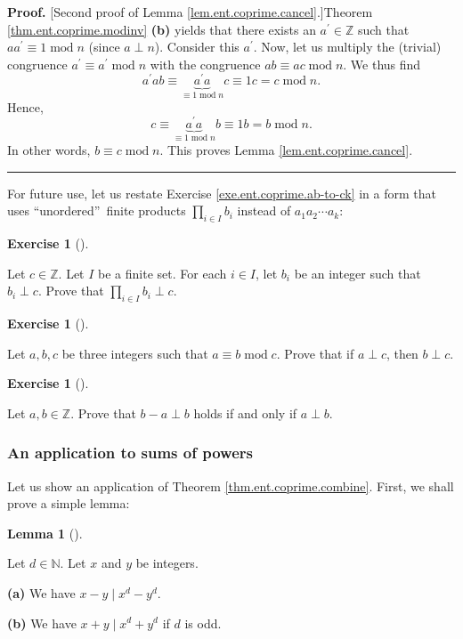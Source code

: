 \documentclass[numbers=enddot,12pt,final,onecolumn,notitlepage]{scrartcl}%
\newcounter{exer}
\numberwithin{exer}{subsection}
\theoremstyle{definition}
\newtheorem{lem}[theo]{Lemma}
\newenvironment{lemma}[1][]
{\begin{lem}[#1]\begin{leftbar}}
{\end{leftbar}\end{lem}}
\newtheorem{exmp}[exer]{Exercise}
\newenvironment{exercise}[1][]
{\begin{exmp}[#1]\begin{leftbar}}
{\end{leftbar}\end{exmp}}
\newenvironment{proof}[1][Proof]{\noindent\textbf{#1.} }{\ \rule{0.5em}{0.5em}}
\let\prodnonlimits\prod
\renewcommand{\prod}{\prodnonlimits\limits}
\begin{document}
\begin{proof}
[Second proof of Lemma \ref{lem.ent.coprime.cancel}.]Theorem
\ref{thm.ent.coprime.modinv} \textbf{(b)} yields that there exists an
$a^{\prime}\in\mathbb{Z}$ such that $aa^{\prime}\equiv1\operatorname{mod}n$
(since $a\perp n$). Consider this $a^{\prime}$. Now, let us multiply the
(trivial) congruence $a^{\prime}\equiv a^{\prime}\operatorname{mod}n$ with the
congruence $ab\equiv ac\operatorname{mod}n$. We thus find%
\[
a^{\prime}ab\equiv\underbrace{a^{\prime}a}_{\equiv1\operatorname{mod}n}%
c\equiv1c=c\operatorname{mod}n.
\]
Hence,
\[
c\equiv\underbrace{a^{\prime}a}_{\equiv1\operatorname{mod}n}b\equiv
1b=b\operatorname{mod}n.
\]
In other words, $b\equiv c\operatorname{mod}n$. This proves Lemma
\ref{lem.ent.coprime.cancel}.
\end{proof}

For future use, let us restate Exercise \ref{exe.ent.coprime.ab-to-ck} in a
form that uses \textquotedblleft unordered\textquotedblright\ finite products
$\prod_{i\in I}b_{i}$ instead of $a_{1}a_{2}\cdots a_{k}$:

\begin{exercise}
\label{exe.ent.coprime.ab-to-cI}Let $c\in\mathbb{Z}$. Let $I$ be a finite set.
For each $i\in I$, let $b_{i}$ be an integer such that $b_{i}\perp c$. Prove
that $\prod_{i\in I}b_{i}\perp c$.
\end{exercise}

\begin{exercise}
\label{exe.ent.coprime.b==c}Let $a,b,c$ be three integers such that $a\equiv
b\operatorname{mod}c$. Prove that if $a\perp c$, then $b\perp c$.
\end{exercise}

\begin{exercise}
\label{exe.ent.coprime.b-a}Let $a,b\in\mathbb{Z}$. Prove that $b-a\perp b$
holds if and only if $a\perp b$.
\end{exercise}

\subsubsection{An application to sums of powers}

Let us show an application of Theorem \ref{thm.ent.coprime.combine}. First, we
shall prove a simple lemma:

\begin{lemma}
\label{lem.ent.xd-yd}Let $d\in\mathbb{N}$. Let $x$ and $y$ be integers.

\textbf{(a)} We have $x-y\mid x^{d}-y^{d}$.

\textbf{(b)} We have $x+y\mid x^{d}+y^{d}$ if $d$ is odd.
\end{lemma}
\end{document}
